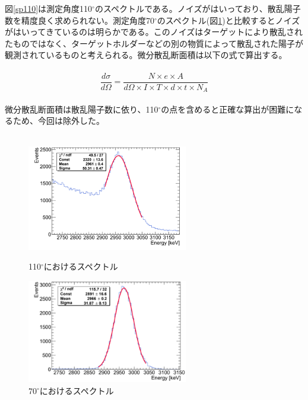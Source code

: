 \documentclass[a4paper,11pt,dvipdfmx]{jsarticle}
\begin{document}
図\ref{sp110}は測定角度110$^\circ$のスペクトルである。ノイズがはいっており、散乱陽子数を精度良く求められない。測定角度70$^\circ$のスペクトル(図\ref{sp70})と比較するとノイズがはいってきているのは明らかである。このノイズはターゲットにより散乱されたものではなく、ターゲットホルダーなどの別の物質によって散乱された陽子が観測されているものと考えられる。微分散乱断面積は以下の式で算出する。\\\\
\begin{equation}
    \frac{d\sigma}{d\Omega} = \frac{N\times e \times A}{d\Omega \times I \times T \times d \times t \times N_A}
    \label{expcross}
\end{equation}\\
微分散乱断面積は散乱陽子数に依り、110$^\circ$の点を含めると正確な算出が困難になるため、今回は除外した。\\\\
\begin{figure}[H]
\begin{minipage}{0.5\hsize}
\begin{center}
\includegraphics[width=70mm]{picture/jan/110hist.png}
\end{center}
\caption{110$^\circ$におけるスペクトル}
\label{sp110}
\end{minipage}
\begin{minipage}{0.5\hsize}
\begin{center}
\includegraphics[width=70mm]{picture/jan/70hist.png}
\end{center}
\caption{70$^\circ$におけるスペクトル}
\label{sp70}
\end{minipage}
\end{figure}
\end{document}
